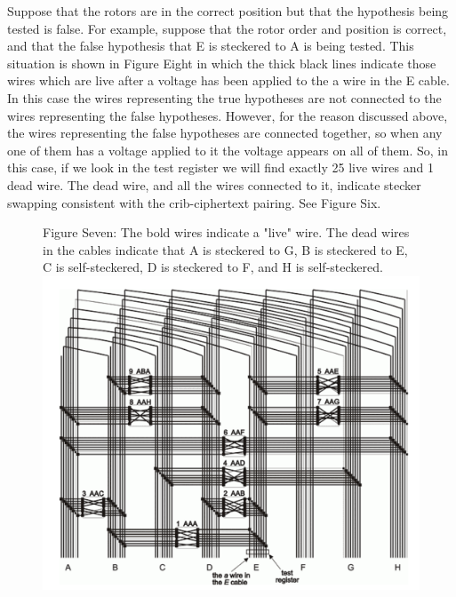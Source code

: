 \documentclass[12pt,a4paper]{article}
\begin{document}
Suppose that the rotors are in the correct position but that the hypothesis being tested is false.
For example, suppose that the rotor order and position is correct, and that the false hypothesis that E is steckered to A is being tested. This situation is shown in Figure Eight in which the thick black lines indicate those wires which are live after a voltage has been applied to the a wire in the E cable. In this case the wires representing the true hypotheses are not connected to the wires representing the false hypotheses. However, for the reason discussed above, the wires representing the false hypotheses are connected together, so when any one of them has a voltage applied to it the voltage appears on all of them. So, in this case, if we look in the test register we will find exactly 25 live wires and 1 dead wire. The dead wire, and all the wires connected to it, indicate stecker swapping consistent with the crib-ciphertext pairing. See Figure Six.

\begin{figure}[H]
\centering
Figure Seven: The bold wires indicate a "live" wire. The dead wires in the cables indicate that A is steckered to G, B is steckered to E, C is self-steckered, D is steckered to F, and H is self-steckered.
\includegraphics[width=\textwidth]{BOMBEfour.png}
\end{figure}
\end{document}
